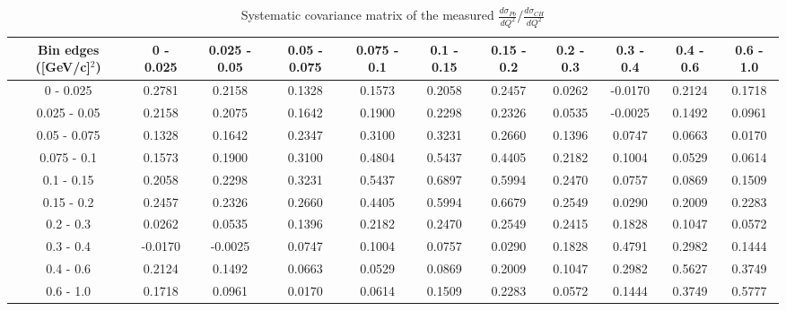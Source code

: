 \documentclass[aps,prl,twocolumn,superscriptaddress,nofootinbib]{revtex4-1}
\begin{document}
\begin{turnpage}
 \begin{table}[h!]
  \centering
  \caption{Systematic covariance matrix of the measured $\frac{d\sigma_{Pb}}{dQ^{2}}/\frac{d\sigma_{CH}}{dQ^{2}}$}
    \begin{tabular}{c||cccccccccc}
      Bin edges ([GeV/c]$^{2}$) & 0 - 0.025 & 0.025 - 0.05 & 0.05 - 0.075 & 0.075 - 0.1 & 0.1 - 0.15 & 0.15 - 0.2 & 0.2 - 0.3 & 0.3 - 0.4 & 0.4 - 0.6 & 0.6 - 1.0 \\
\hline \hline
         0 - 0.025 &  0.2781 &  0.2158 &  0.1328 &  0.1573 &  0.2058 &  0.2457 &  0.0262 & -0.0170 &  0.2124 &  0.1718 \\
      0.025 - 0.05 &  0.2158 &  0.2075 &  0.1642 &  0.1900 &  0.2298 &  0.2326 &  0.0535 & -0.0025 &  0.1492 &  0.0961 \\
      0.05 - 0.075 &  0.1328 &  0.1642 &  0.2347 &  0.3100 &  0.3231 &  0.2660 &  0.1396 &  0.0747 &  0.0663 &  0.0170 \\
       0.075 - 0.1 &  0.1573 &  0.1900 &  0.3100 &  0.4804 &  0.5437 &  0.4405 &  0.2182 &  0.1004 &  0.0529 &  0.0614 \\
        0.1 - 0.15 &  0.2058 &  0.2298 &  0.3231 &  0.5437 &  0.6897 &  0.5994 &  0.2470 &  0.0757 &  0.0869 &  0.1509 \\
        0.15 - 0.2 &  0.2457 &  0.2326 &  0.2660 &  0.4405 &  0.5994 &  0.6679 &  0.2549 &  0.0290 &  0.2009 &  0.2283 \\
         0.2 - 0.3 &  0.0262 &  0.0535 &  0.1396 &  0.2182 &  0.2470 &  0.2549 &  0.2415 &  0.1828 &  0.1047 &  0.0572 \\
         0.3 - 0.4 & -0.0170 & -0.0025 &  0.0747 &  0.1004 &  0.0757 &  0.0290 &  0.1828 &  0.4791 &  0.2982 &  0.1444 \\
         0.4 - 0.6 &  0.2124 &  0.1492 &  0.0663 &  0.0529 &  0.0869 &  0.2009 &  0.1047 &  0.2982 &  0.5627 &  0.3749 \\
         0.6 - 1.0 &  0.1718 &  0.0961 &  0.0170 &  0.0614 &  0.1509 &  0.2283 &  0.0572 &  0.1444 &  0.3749 &  0.5777 \\
    \end{tabular}
  \label{tablecov:Pb_Systematic_Q2}
 \end{table}
\end{turnpage}
\end{document}
